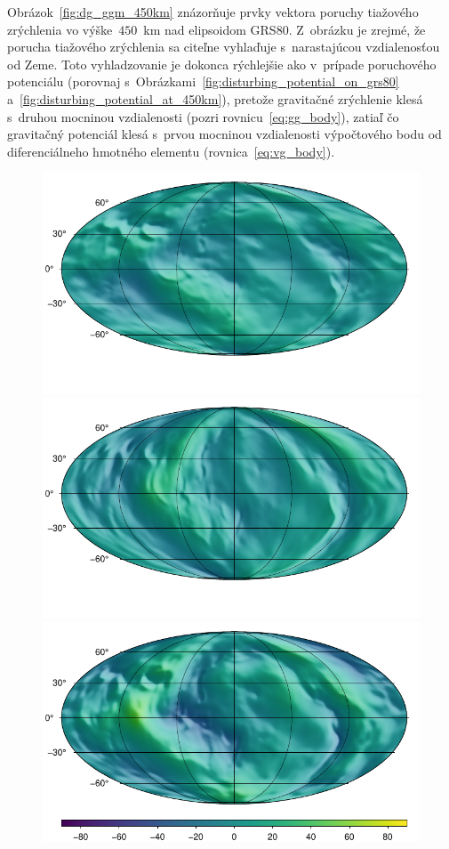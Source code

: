 \documentclass[a4paper,12pt]{book}
\begin{document}
Obrázok~\ref{fig:dg_ggm_450km} znázorňuje prvky vektora poruchy tiažového 
zrýchlenia vo výške~$450$~km nad elipsoidom GRS80.  Z~obrázku je zrejmé, že 
porucha tiažového zrýchlenia sa citeľne vyhlaďuje s~narastajúcou vzdialenosťou 
od Zeme.  Toto vyhladzovanie je dokonca rýchlejšie ako v~prípade poruchového 
potenciálu (porovnaj s~Obrázkami~\ref{fig:disturbing_potential_on_grs80} 
a~\ref{fig:disturbing_potential_at_450km}), pretože gravitačné zrýchlenie klesá 
s~druhou mocninou vzdialenosti (pozri rovnicu~\ref{eq:gg_body}), zatiaľ čo 
gravitačný potenciál klesá s~prvou mocninou vzdialenosti výpočtového bodu od 
diferenciálneho hmotného elementu (rovnica~\ref{eq:vg_body}).

\begin{figure}
\centering
\includegraphics{./fig-gravity-disturbance-at-450km-x.pdf}
\includegraphics{./fig-gravity-disturbance-at-450km-y.pdf}
\includegraphics{./fig-gravity-disturbance-at-450km-z.pdf}

\end{figure}
\end{document}
